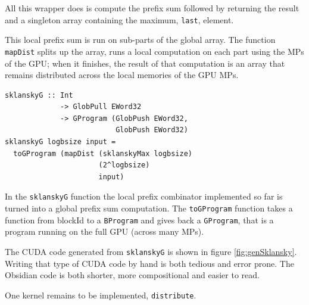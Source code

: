 All this wrapper does is compute the prefix sum followed by returning the  
result and a singleton array containing the maximum, {\tt last}, element. 

This local prefix sum is run on sub-parts of the global array. The function
{\tt mapDist} splits up the array, runs a local computation on each part using
the MPs of the GPU; when it finishes, the result of that computation is an array
that remains distributed across the local memories of the GPU MPs. 

\begin{small}
\begin{Verbatim}[samepage=true]
sklanskyG :: Int 
             -> GlobPull EWord32
             -> GProgram (GlobPush EWord32, 
                          GlobPush EWord32)
sklanskyG logbsize input =
  toGProgram (mapDist (sklanskyMax logbsize) 
                      (2^logbsize) 
                      input)
\end{Verbatim}  
\end{small}


In the {\tt sklanskyG} function the local prefix combinator implemented 
so far is turned into a global prefix sum computation. 
The {\tt toGProgram} function takes a function from blockId to 
a {\tt BProgram} and gives back a {\tt GProgram}, that is a program running 
on the full GPU (across many MPs). 

The CUDA code generated from {\tt sklanskyG} is shown in figure
\ref{fig:genSklansky}. Writing that type of CUDA code by hand is both
tedious and error prone. The Obsidian code is both shorter, more
compositional and easier to read.

One kernel remains to be implemented, {\tt distribute}.

